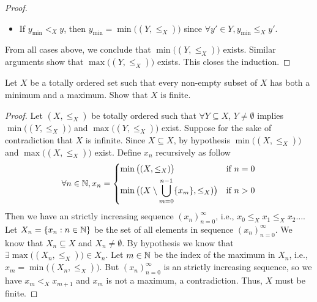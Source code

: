 \begin{proof}
\begin{itemize}
\begin{align*}
            \implies & (y' = y) \lor (y' \in Y \setminus \set{y})                                             \\
            \implies & (y' = y) \lor (y_{\min} <_X y')            &  & \by{i:8.5.5}                           \\
            \implies & (y' = y) \lor (y <_X y')                   &  & \text{(\((X, \leq_X)\) is transitive)} \\
            \implies & y \leq_X y'.
          \end{align*}
    \item If \(y_{\min} <_X y\), then \(y_{\min} = \min\big((Y, \leq_X)\big)\) since \(\forall y' \in Y, y_{\min} \leq_X y'\).
  \end{itemize}
  From all cases above, we conclude that \(\min\big((Y, \leq_X)\big)\) exists.
  Similar arguments show that \(\max\big((Y, \leq_X)\big)\) exists.
  This closes the induction.
\end{proof}

\begin{ex}\label{i:ex:8.5.9}
  Let \(X\) be a totally ordered set such that every non-empty subset of \(X\) has both a minimum and a maximum.
  Show that \(X\) is finite.
\end{ex}

\begin{proof}
  Let \((X, \leq_X)\) be totally ordered such that \(\forall Y \subseteq X\), \(Y \neq \emptyset\) implies \(\min\big((Y, \leq_X)\big)\) and \(\max\big((Y, \leq_X)\big)\) exist.
  Suppose for the sake of contradiction that \(X\) is infinite.
  Since \(X \subseteq X\), by hypothesis \(\min\big((X, \leq_X)\big)\) and \(\max\big((X, \leq_X)\big)\) exist.
  Define \(x_n\) recursively as follow
  \[
    \forall n \in \N, x_n = \begin{dcases}
      \min\big((X, \leq_X)\big)                                             & \text{if } n = 0 \\
      \min\big((X \setminus \bigcup_{m = 0}^{n - 1} \set{x_m}, \leq_X)\big) & \text{if } n > 0
    \end{dcases}
  \]
  Then we have an strictly increasing sequence \((x_n)_{n = 0}^\infty\), i.e., \(x_0 \leq_X x_1 \leq_X x_2 \dots\).
  Let \(X_n = \left\lbrace x_n : n \in \mathbb{N}\right\rbrace\) be the set of all elements in sequence \((x_n)_{n = 0}^\infty\).
  We know that \(X_n \subseteq X\) and \(X_n \neq \emptyset\).
  By hypothesis we know that \(\exists \max\big((X_n, \leq_X)\big) \in X_n\).
  Let \(m \in \mathbb{N}\) be the index of the maximum in \(X_n\), i.e., \(x_m = \min\big((X_n, \leq_X)\big)\).
  But \((x_n)_{n = 0}^\infty\) is an strictly increasing sequence, so we have \(x_m <_X x_{m + 1}\) and \(x_m\) is not a maximum, a contradiction.
  Thus, \(X\) must be finite.
\end{proof}

